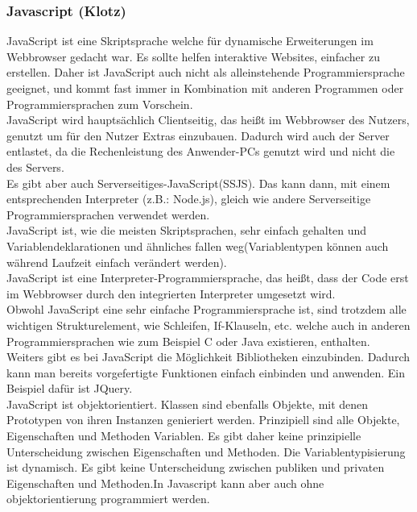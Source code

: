 \subsubsection{Javascript (Klotz)}
\label{sec:content_js_Javascript}
JavaScript ist eine Skriptsprache welche für dynamische Erweiterungen im Webbrowser gedacht war. Es sollte helfen interaktive Websites, einfacher zu erstellen. Daher ist JavaScript auch nicht als alleinstehende Programmiersprache geeignet, und kommt fast immer in Kombination mit anderen Programmen oder Programmiersprachen zum Vorschein.\\
JavaScript wird hauptsächlich Clientseitig, das heißt im Webbrowser des Nutzers, genutzt um für den Nutzer Extras einzubauen. Dadurch wird auch der Server entlastet, da die Rechenleistung des Anwender-PCs genutzt wird und nicht die des Servers.\\
 Es gibt aber auch Serverseitiges-JavaScript(SSJS). Das kann dann, mit einem entsprechenden Interpreter (z.B.: Node.js), gleich wie andere Serverseitige Programmiersprachen verwendet werden.\\
JavaScript ist, wie die meisten Skriptsprachen, sehr einfach gehalten und Variablendeklarationen und ähnliches fallen weg(Variablentypen können auch während Laufzeit einfach verändert werden).\\
JavaScript ist eine Interpreter-Programmiersprache, das heißt, dass der Code erst im Webbrowser durch den integrierten Interpreter umgesetzt wird.\\
Obwohl JavaScript eine sehr einfache Programmiersprache ist, sind trotzdem alle wichtigen Strukturelement, wie Schleifen, If-Klauseln, etc. welche auch in anderen Programmiersprachen wie zum Beispiel C oder Java existieren, enthalten.\\
Weiters gibt es bei JavaScript die Möglichkeit Bibliotheken einzubinden. Dadurch kann man bereits vorgefertigte Funktionen einfach einbinden und anwenden. Ein Beispiel dafür ist JQuery.\\
JavaScript ist objektorientiert. Klassen sind ebenfalls Objekte, mit denen Prototypen von ihren
Instanzen genieriert werden. Prinzipiell sind alle Objekte, Eigenschaften und Methoden Variablen.
Es gibt daher keine prinzipielle Unterscheidung zwischen Eigenschaften und Methoden.
Die Variablentypisierung ist dynamisch. Es gibt keine Unterscheidung zwischen publiken und
privaten Eigenschaften und Methoden.In Javascript kann aber auch ohne objektorientierung programmiert werden.
\\

